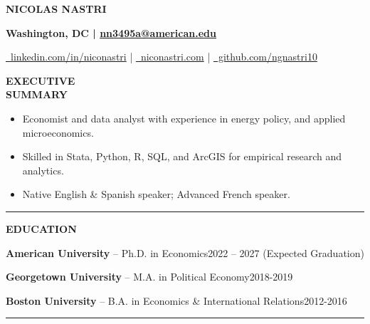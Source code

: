 \documentclass[11pt,letterpaper]{article}
\newcommand{\basefont}{\fontsize{11.5pt}{13.65pt}\selectfont}
\newcommand{\namefont}{\fontsize{25pt}{27pt}\selectfont}
\newcommand{\contactfont}{\fontsize{11.5pt}{13pt}\selectfont}
\newcommand{\sectionlabel}[1]{%
  {\centering\bfseries\MakeUppercase{#1}\par}
}
\newcommand{\sectionrule}{\vspace{0.4em}\noindent\rule{\textwidth}{0.5pt}\vspace{0.4em}}
\newcommand{\resrow}[2]{%
  \noindent
  \begin{minipage}[t]{1.06in}
    \sectionlabel{#1}
  \end{minipage}%
  \hspace{0.16in}%
  \begin{minipage}[t]{5.88in}
    \justifying #2
  \end{minipage}\par
}
\newcommand{\entryline}[2]{\noindent #1\hfill #2\par}
\begin{document}
\basefont

\begin{center}
{\namefont\bfseries NICOLAS NASTRI}
\end{center}

\vspace{-0.35cm}
\begin{center}
{\contactfont\bfseries Washington, DC \;|\; \href{mailto:nn3495a@american.edu}{nn3495a@american.edu}}
\end{center}

\vspace{-0.75cm}
\begin{center}
{\contactfont
\href{https://www.linkedin.com/in/niconastri/}{\faLinkedin\ linkedin.com/in/niconastri} \;|\;
\href{https://niconastri.com/}{\faGlobe\ niconastri.com} \;|\;
\href{https://github.com/ngnastri10}{\faGithub\ github.com/ngnastri10}}
\end{center}

\vspace{.3cm}

\resrow{Executive\\Summary}{%
\begin{itemize}
    \item Economist and data analyst with experience in energy policy, and applied microeconomics.
    \item Skilled in Stata, Python, R, SQL, and ArcGIS for empirical research and analytics.
    \item Native English \& Spanish speaker; Advanced French speaker.
\end{itemize}}

\sectionrule

\resrow{Education}{%
\entryline{\textbf{American University} -- Ph.D. in Economics}{2022 -- 2027 (Expected Graduation)}
\entryline{\textbf{Georgetown University} -- M.A. in Political Economy}{2018-2019}
\entryline{\textbf{Boston University} -- B.A. in Economics \& International Relations}{2012-2016}}

\sectionrule
\end{document}
